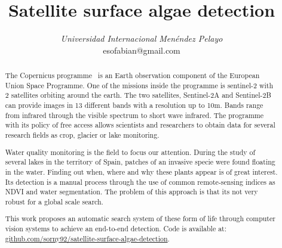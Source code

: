 \documentclass[conference]{IEEEtran}
\begin{document}
    \title{Satellite surface algae detection}

    \author{
    \textit{Universidad Internacional Menéndez Pelayo}\\
    esofabian@gmail.com}

    \maketitle

    \begin{abstract}
        The Copernicus programme~\citep{whatiscopernicus} is an Earth observation component of the European Union Space
        Programme.
        One of the missions inside the programme is sentinel-2\citep{sentinel-2} with 2 satellites orbiting around the
        earth.
        The two satellites, Sentinel-2A and Sentinel-2B can provide images in 13 different bands with a resolution up
        to 10m.
        Bands range from infrared through the visible spectrum to short wave infrared.
        The programme with its policy of free access allows scientists and researchers to obtain data for several
        research fields as crop, glacier or lake monitoring.

        Water quality monitoring is the field to focus our attention.
        During the study of several lakes in the territory of Spain, patches of an invasive specie were found
        floating in the water.
        Finding out when, where and why these plants appear is of great interest.
        Its detection is a manual process through the use of common remote-sensing indices as NDVI\citep{NDVIsource}
        and water segmentation.
        The problem of this approach is that its not very robust for a global scale search.

        This work proposes an automatic search system of these form of life through computer vision systems to
        achieve an end-to-end detection.
        Code is available at: \href{https://github.com/sorny92/satellite-surface-algae-detection}{github.com/sorny92/satellite-surface-algae-detection}.
    \end{abstract}
\end{document}
